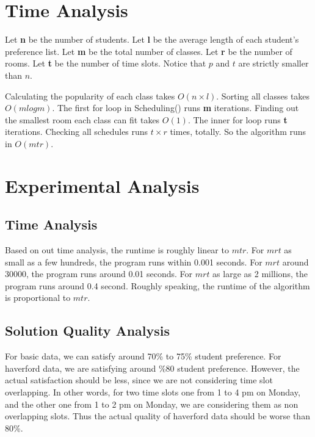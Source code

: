 \documentclass[11pt, oneside]{article}   	%
\begin{document}
\begin{algorithm}[H]

\end{algorithm}
\section{Time Analysis}
Let \textbf{n} be the number of students. 
Let \textbf{l} be the average length of each student's preference list.
Let \textbf{m} be the total number of classes. 
Let \textbf{r} be the number of rooms. 
Let \textbf{t} be the number of time slots. 
Notice that $p$ and $t$ are strictly smaller than $n$.

Calculating the popularity of each class takes $O(n\times l)$. Sorting all classes takes $O(mlogm)$. The first for loop in Scheduling() runs \textbf{m} iterations. Finding out the smallest room each class can fit takes $O(1)$. The inner for loop runs \textbf{t} iterations. Checking all schedules runs $t \times r$ times, totally. So the algorithm runs in $O(mtr)$.

\section{Experimental Analysis}
\subsection{Time Analysis}
Based on out time analysis, the runtime is roughly linear to $mtr$. For $mrt$ as small as a few hundreds, the program runs within 0.001 seconds. For $mrt$ around 30000, the program runs around 0.01 seconds. For $mrt$ as large as 2 millions, the program runs around 0.4 second. Roughly speaking, the runtime of the algorithm is proportional to $mtr$. 

\subsection{Solution Quality Analysis}
For basic data, we can satisfy around 70\% to 75\% student preference. For haverford data, we are satisfying around \%80 student preference. However, the actual satisfaction should be less, since we are not considering time slot overlapping. In other words, for two time slots one from 1 to 4 pm on Monday, and the other one from 1 to 2 pm on Monday, we are considering them as non overlapping slots. Thus the actual quality of haverford data should be worse than 80\%.
\end{document}

